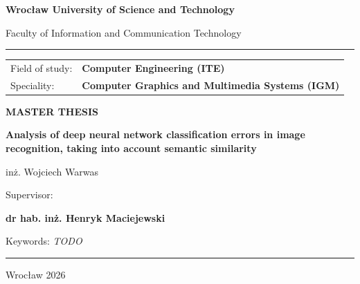 \sffamily
\begin{titlepage}

    \begin{center}
        {\LARGE\bfseries Wrocław University of Science and Technology \par}
        \vspace{0.4cm}
        {\Large Faculty of Information and Communication Technology \par}
    \end{center}
    \par\noindent\rule{\textwidth}{1pt}\par
    \vspace{0.5cm}

    {\large
        \begin{tabular}{@{}ll}
            Field of study: & \textbf{Computer Engineering (ITE)}                     \\
            Speciality:     & \textbf{Computer Graphics and Multimedia Systems (IGM)}
        \end{tabular}
    }

    \vspace*{\fill}

    \begin{center}
        {\huge\bfseries MASTER THESIS \par}
        \vspace{2.0cm}
        {\Large \bfseries Analysis of deep neural network classification errors in
            image recognition, taking into account semantic similarity \par}
        \vspace{1cm}
        {\Large inż. Wojciech Warwas \par}
        \vspace{2cm}
        {\large Supervisor:\par \textbf{dr hab. inż. Henryk Maciejewski} \par}
    \end{center}

    \vspace*{\fill}

    {\raggedright
        \small Keywords: \textit{TODO}\par
        \vspace{0.5em}
        \par\noindent\rule{\textwidth}{1pt}\par
    }

    \begin{center}
        \Large Wrocław 2026
    \end{center}

    \restoregeometry
\end{titlepage}
\normalfont
\pagestyle{empty}